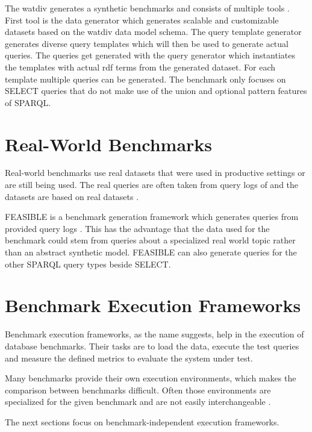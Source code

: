 The \ac{watdiv} generates a synthetic benchmarks and consists of multiple tools \cite{alucDiversifiedStressTesting2014}.
First tool is the data generator which generates scalable and customizable datasets based on the \ac{watdiv} data model schema.
The query template generator generates diverse query templates which will then be used to generate actual queries.
The queries get generated with the query generator which instantiates the templates with actual \ac{rdf} terms from the generated dataset.
For each template multiple queries can be generated.
The benchmark only focuses on SELECT queries that do not make use of the union and optional pattern features of SPARQL.

\section{Real-World Benchmarks}
\label{sec:benchmarks_real_data}
Real-world benchmarks use real datasets that were used in productive settings or are still being used.
The real queries are often taken from query logs of \tsp{} and the datasets are based on real datasets \cite{morseyDBpediaSPARQLBenchmark2011, saleemFEASIBLEFeatureBasedSPARQL2015}.

FEASIBLE is a benchmark generation framework which generates queries from provided query logs \cite{saleemFEASIBLEFeatureBasedSPARQL2015}.
This has the advantage that the data used for the benchmark could stem from queries about a specialized real world topic rather than an abstract synthetic model.
FEASIBLE can also generate queries for the other SPARQL query types beside SELECT.

\section{Benchmark Execution Frameworks}
\label{sec:benchmark_frameworks}
Benchmark execution frameworks, as the name suggests, help in the execution of database benchmarks.
Their tasks are to load the data, execute the test queries and measure the defined metrics to evaluate the system under test.

Many benchmarks provide their own execution environments, which makes the comparison between benchmarks difficult.
Often those environments are specialized for the given benchmark and are not easily interchangeable \cite{conradsIguanaGenericFramework2017}.

The next sections focus on benchmark-independent execution frameworks.


